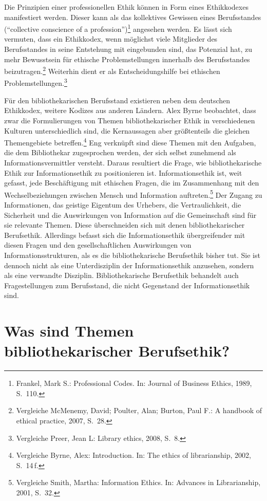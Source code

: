 \documentclass[output=paper]{langscibook}
\begin{document}
Die Prinzipien einer professionellen Ethik können in Form eines
Ethikkodexes manifestiert werden. Dieser kann als das kollektives
Gewissen eines Berufsstandes (\enquote{collective conscience of a
profession})\footnote{Frankel, Mark S.: Professional Codes. In: Journal
  of Business Ethics, 1989, S.~110.} angesehen werden. Es lässt sich
vermuten, dass ein Ethikkodex, wenn möglichst viele Mitglieder des
Berufsstandes in seine Entstehung mit eingebunden sind, das Potenzial
hat, zu mehr Bewusstsein für ethische Problemstellungen innerhalb des
Berufsstandes beizutragen.\footnote{Vergleiche McMenemy, David; Poulter, Alan;
  Burton, Paul F.: A handbook of ethical practice, 2007, S.~28.}
Weiterhin dient er als Entscheidungshilfe bei ethischen
Problemstellungen.\footnote{Vergleiche Preer, Jean L: Library ethics, 2008, S.~8.}

Für den bibliothekarischen Berufsstand existieren neben dem deutschen
Ethikkodex, weitere Kodizes aus anderen Ländern. Alex Byrne beobachtet,
dass zwar die Formulierungen von Themen bibliothekarischer Ethik in
verschiedenen Kulturen unterschiedlich sind, die Kernaussagen aber
größtenteils die gleichen Themengebiete betreffen.\footnote{Vergleiche Byrne,
  Alex: Introduction. In: The ethics of librarianship, 2002, S.~14\,f.}
Eng verknüpft sind diese Themen mit den Aufgaben, die dem Bibliothekar
zugesprochen werden, der sich selbst zunehmend als
Informationsvermittler versteht. Daraus resultiert die Frage, wie
bibliothekarische Ethik zur Informationsethik zu positionieren ist.
Informationsethik ist, weit gefasst, jede Beschäftigung mit ethischen
Fragen, die im Zusammenhang mit den Wechselbeziehungen zwischen Mensch
und Information auftreten.\footnote{Vergleiche Smith, Martha: Information
  Ethics. In: Advances in Librarianship, 2001, S.~32.} Der Zugang zu
Informationen, das geistige Eigentum des Urhebers, die Vertraulichkeit,
die Sicherheit und die Auswirkungen von Information auf die Gemeinschaft
sind für sie relevante Themen. Diese überschneiden sich mit denen
bibliothekarischer Berufsethik. Allerdings befasst sich die
Informationsethik übergreifender mit diesen Fragen und den
gesellschaftlichen Auswirkungen von Informationsstrukturen, als es die
bibliothekarische Berufsethik bisher tut. Sie ist dennoch nicht als eine
Unterdisziplin der Informationsethik anzusehen, sondern als eine
verwandte Disziplin. Bibliothekarische Berufsethik behandelt auch
Fragestellungen zum Berufsstand, die nicht Gegenstand der
Informationsethik sind.

\hypertarget{was-sind-themen-bibliothekarischer-berufsethik}{%
\section*{Was sind Themen bibliothekarischer
Berufsethik?}\label{was-sind-themen-bibliothekarischer-berufsethik}}
\end{document}
